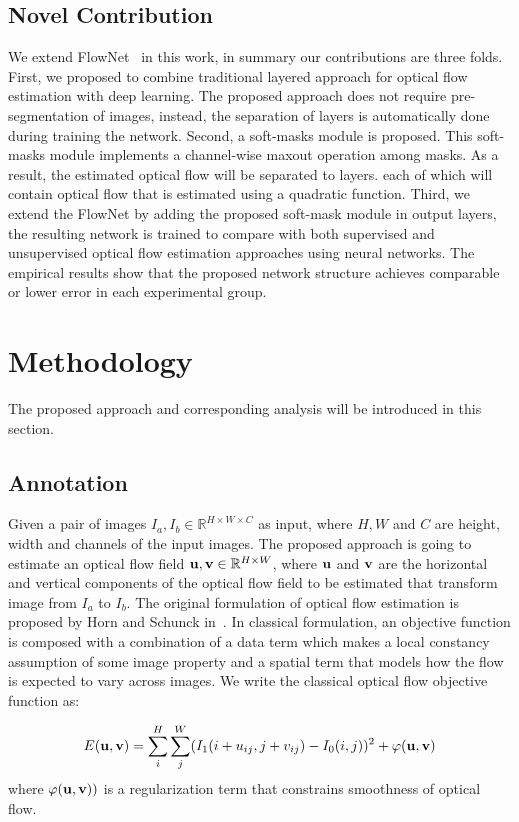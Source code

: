 \documentclass[10pt,twocolumn,letterpaper]{article}
\begin{document}
\subsection{Novel Contribution}
We extend FlowNet~\cite{7410673} in this work, in summary our contributions are three folds. First, we proposed to combine traditional layered approach for optical flow estimation with deep learning. The proposed approach does not require pre-segmentation of images, instead, the separation of layers is automatically done during training the network. Second, a soft-masks module is proposed. This soft-masks module implements a channel-wise maxout operation among masks. As a result, the estimated optical flow will be separated to layers. each of which will contain optical flow that is estimated using a quadratic function. Third, we extend the FlowNet by adding the proposed soft-mask module in output layers, the resulting network is trained to compare with both supervised and unsupervised optical flow estimation approaches using neural networks. The empirical results show that the proposed network structure achieves comparable or lower error in each experimental group.

\section{Methodology}
The proposed approach and corresponding analysis will be introduced in this section.

\subsection{Annotation}
Given a pair of images $I_a, I_b \in \mathbb{R}^{H\times W\times C}$ as input, where $H, W$ and $C$ are height, width and channels of the input images. The proposed approach is going to estimate an optical flow field $\bold{u}, \bold{v} \in \mathbb{R}^{H\times W}$, where $\bold{u}$ and $\bold{v}$ are the horizontal and vertical components of the optical flow field to be estimated that transform image from $I_a$ to $I_b$. The original formulation of optical flow estimation is proposed by Horn and Schunck in~\cite{horn1981determining}. In classical formulation, an objective function is composed with a combination of a data term which makes a local constancy assumption of some image property and a spatial term that models how the flow is expected to vary across images. We write the classical optical flow objective function as:

\begin{equation}
\label{eqn: flow objective}
E(\bold{u}, \bold{v}) = \sum_{i}^H\sum_{j}^W (I_1(i+u_{ij}, j+v_{ij}) - I_0(i, j))^2 + \varphi(\bold{u, v})
\end{equation}
where $\varphi(\bold{u}, \bold{v}))$ is a regularization term that constrains smoothness of optical flow. 
\end{document}
